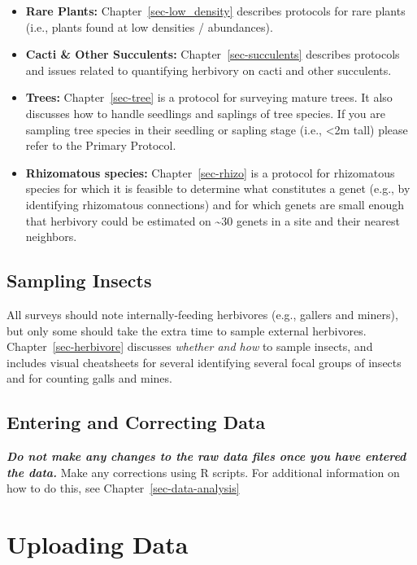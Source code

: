 \documentclass[
  letterpaper,
  DIV=11,
  numbers=noendperiod]{scrreprt}
\begin{document}
\begin{itemize}
\item
  \textbf{Rare Plants:} Chapter~\ref{sec-low_density} describes
  protocols for rare plants (i.e., plants found at low densities /
  abundances).
\item
  \textbf{Cacti \& Other Succulents:} Chapter~\ref{sec-succulents}
  describes protocols and issues related to quantifying herbivory on
  cacti and other succulents.
\item
  \textbf{Trees:} Chapter~\ref{sec-tree} is a protocol for surveying
  mature trees. It also discusses how to handle seedlings and saplings
  of tree species. If you are sampling tree species in their seedling or
  sapling stage (i.e., \textless2m tall) please refer to the Primary
  Protocol.
\item
  \textbf{Rhizomatous species:} Chapter~\ref{sec-rhizo} is a protocol
  for rhizomatous species for which it is feasible to determine what
  constitutes a genet (e.g., by identifying rhizomatous connections) and
  for which genets are small enough that herbivory could be estimated on
  \textasciitilde30 genets in a site and their nearest neighbors.
\end{itemize}

\section{Sampling Insects}\label{sampling-insects}

All surveys should note internally-feeding herbivores (e.g., gallers and
miners), but only some should take the extra time to sample external
herbivores. Chapter~\ref{sec-herbivore} discusses \emph{whether and how}
to sample insects, and includes visual cheatsheets for several
identifying several focal groups of insects and for counting galls and
mines.

\section{Entering and Correcting
Data}\label{entering-and-correcting-data}

\textbf{\emph{Do not make any changes to the raw data files once you
have entered the data.}} Make any corrections using R scripts. For
additional information on how to do this, see
Chapter~\ref{sec-data-analysis}

\chapter{Uploading Data}\label{uploading-data}
\end{document}
